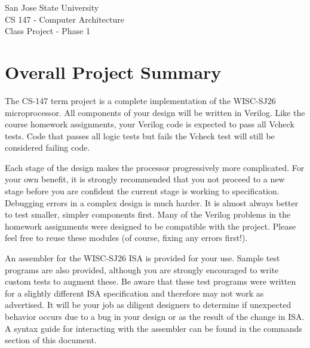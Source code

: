 \documentclass[12pt]{article}
\begin{document}
\begin{center}
{\LARGE San Jose State University}\\[0.5em]
{\LARGE CS 147 - Computer Architecture}\\[0.5em]
{\LARGE Class Project - Phase 1}
\end{center}

\vspace{2em}

\section*{Overall Project Summary}
The CS-147 term project is a complete implementation of the WISC-SJ26 microprocessor. All components of your design will be written in Verilog. Like the course homework assignments, your Verilog code is expected to pass all Vcheck tests. Code that passes all logic tests but fails the Vcheck test will still be considered failing code.

Each stage of the design makes the processor progressively more complicated. For your own benefit, it is strongly recommended that you not proceed to a new stage before you are confident the current stage is working to specification. Debugging errors in a complex design is much harder. It is almost always better to test smaller, simpler components first. Many of the Verilog problems in the homework assignments were designed to be compatible with the project. Please feel free to reuse these modules (of course, fixing any errors first!).

An assembler for the WISC-SJ26 ISA is provided for your use. Sample test programs are also provided, although you are strongly encouraged to write custom tests to augment these. Be aware that these test programs were written for a slightly different ISA specification and therefore may not work as advertised. It will be your job as diligent designers to determine if unexpected behavior occurs due to a bug in your design or as the result of the change in ISA. A syntax guide for interacting with the assembler can be found in the commands section of this document.
\end{document}
